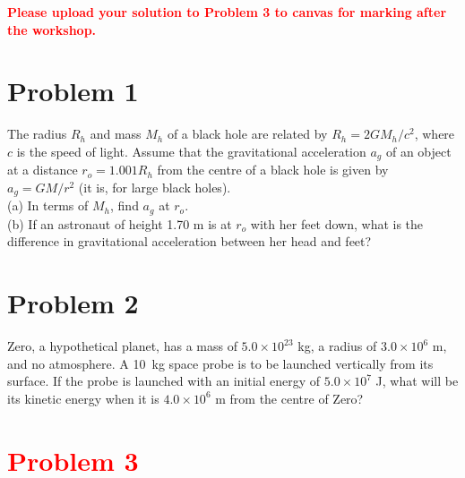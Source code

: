 \documentclass[11pt]{article}
\begin{document}
\noindent
\textbf{\textcolor{red}{Please upload your solution to Problem 3 to canvas for marking after the workshop.}}\\

\section*{Problem 1}

The radius $R_h$ and mass $M_h$ of a black hole are related by $R_h = 2GM_h / c^2$, where $c$ is the speed of light. Assume that the gravitational acceleration $a_g$ of an object at a distance $r_o = 1.001R_h$ from the centre of a black hole is given by $a_g = GM / r^2$ (it is, for large black holes). \\
(a) In terms of $M_h$, find $a_g$ at $r_o$. \\
(b) If an astronaut of height 1.70 m is at $r_o$ with her feet down, what is the difference in gravitational acceleration between her head and feet? \\



\noindent

\section*{Problem 2}

Zero, a hypothetical planet, has a mass of $5.0 \times10^{23}$ kg, a radius of $3.0 \times 10^6$ m, and no atmosphere. A 10~kg space probe is to be launched vertically from its surface. If the probe is launched with an initial energy of $5.0 \times 10^7$ J, what will be its kinetic energy when it is $4.0 \times 10^6$ m from the centre of Zero?\\


\section*{\textcolor{red}{Problem 3}}
\end{document}
